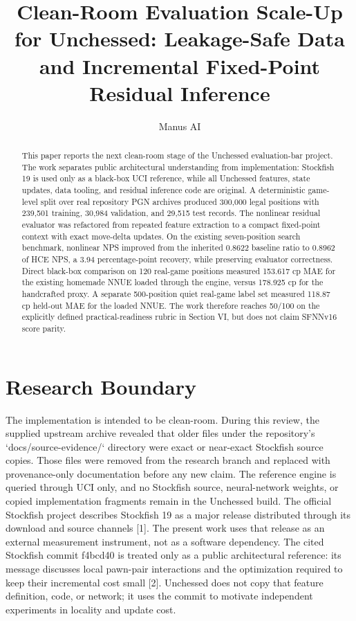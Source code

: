 \documentclass[conference]{IEEEtran}
\title{Clean-Room Evaluation Scale-Up for Unchessed: Leakage-Safe Data and Incremental Fixed-Point Residual Inference}
\author{Manus AI}
\begin{document}
\maketitle

\begin{abstract}
This paper reports the next clean-room stage of the Unchessed evaluation-bar project. The work separates public architectural understanding from implementation: Stockfish 19 is used only as a black-box UCI reference, while all Unchessed features, state updates, data tooling, and residual inference code are original. A deterministic game-level split over real repository PGN archives produced 300,000 legal positions with 239,501 training, 30,984 validation, and 29,515 test records. The nonlinear residual evaluator was refactored from repeated feature extraction to a compact fixed-point context with exact move-delta updates. On the existing seven-position search benchmark, nonlinear NPS improved from the inherited 0.8622 baseline ratio to 0.8962 of HCE NPS, a 3.94 percentage-point recovery, while preserving evaluator correctness. Direct black-box comparison on 120 real-game positions measured 153.617 cp MAE for the existing homemade NNUE loaded through the engine, versus 178.925 cp for the handcrafted proxy. A separate 500-position quiet real-game label set measured 118.87 cp held-out MAE for the loaded NNUE. The work therefore reaches 50/100 on the explicitly defined practical-readiness rubric in Section VI, but does not claim SFNNv16 score parity.
\end{abstract}

\section{Research Boundary}
The implementation is intended to be clean-room. During this review, the supplied upstream archive revealed that older files under the repository's `docs/source-evidence/` directory were exact or near-exact Stockfish source copies. Those files were removed from the research branch and replaced with provenance-only documentation before any new claim. The reference engine is queried through UCI only, and no Stockfish source, neural-network weights, or copied implementation fragments remain in the Unchessed build. The official Stockfish project describes Stockfish 19 as a major release distributed through its download and source channels [1]. The present work uses that release as an external measurement instrument, not as a software dependency. The cited Stockfish commit f4bcd40 is treated only as a public architectural reference: its message discusses local pawn-pair interactions and the optimization required to keep their incremental cost small [2]. Unchessed does not copy that feature definition, code, or network; it uses the commit to motivate independent experiments in locality and update cost.
\end{document}
